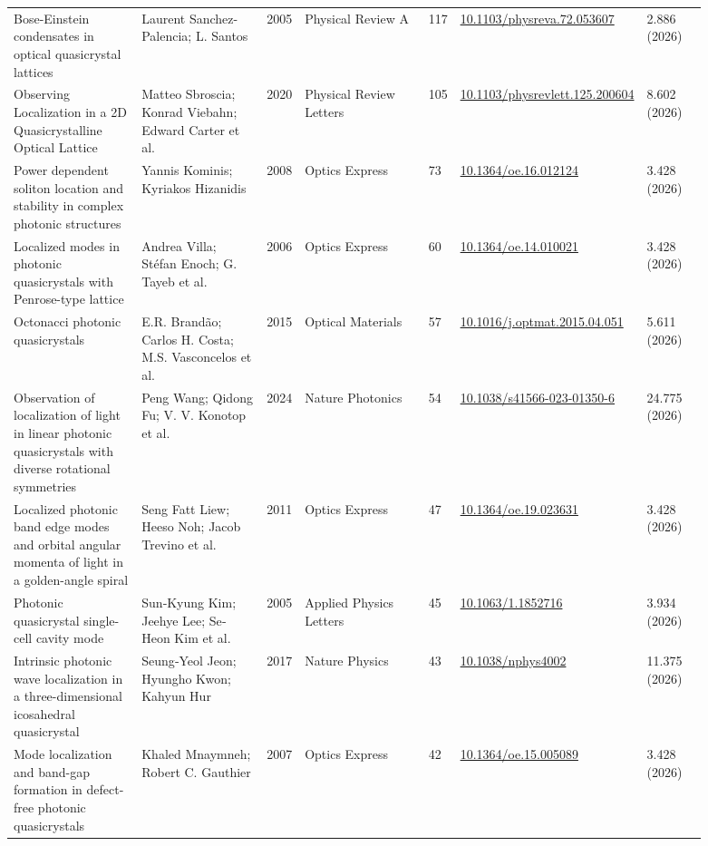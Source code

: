 \documentclass[10pt,a4paper]{article}
\begin{document}
{\begin{longtable}{p{0.192\linewidth}p{0.192\linewidth}p{0.043\linewidth}p{0.192\linewidth}p{0.043\linewidth}p{0.132\linewidth}p{0.096\linewidth}}
Bose-Einstein condensates in optical quasicrystal lattices & Laurent Sanchez-Palencia; L. Santos & 2005 & Physical Review A & 117 & \href{https://doi.org/10.1103/physreva.72.053607}{10.1103/physreva.72.053607} & 2.886 (2026) \\
Observing Localization in a 2D Quasicrystalline Optical Lattice & Matteo Sbroscia; Konrad Viebahn; Edward Carter et al. & 2020 & Physical Review Letters & 105 & \href{https://doi.org/10.1103/physrevlett.125.200604}{10.1103/physrevlett.125.200604} & 8.602 (2026) \\
Power dependent soliton location and stability in complex photonic structures & Yannis Kominis; Kyriakos Hizanidis & 2008 & Optics Express & 73 & \href{https://doi.org/10.1364/oe.16.012124}{10.1364/oe.16.012124} & 3.428 (2026) \\
Localized modes in photonic quasicrystals with Penrose-type lattice & Andrea Villa; Stéfan Enoch; G. Tayeb et al. & 2006 & Optics Express & 60 & \href{https://doi.org/10.1364/oe.14.010021}{10.1364/oe.14.010021} & 3.428 (2026) \\
Octonacci photonic quasicrystals & E.R. Brandão; Carlos H. Costa; M.S. Vasconcelos et al. & 2015 & Optical Materials & 57 & \href{https://doi.org/10.1016/j.optmat.2015.04.051}{10.1016/j.optmat.2015.04.051} & 5.611 (2026) \\
Observation of localization of light in linear photonic quasicrystals with diverse rotational symmetries & Peng Wang; Qidong Fu; V. V. Konotop et al. & 2024 & Nature Photonics & 54 & \href{https://doi.org/10.1038/s41566-023-01350-6}{10.1038/s41566-023-01350-6} & 24.775 (2026) \\
Localized photonic band edge modes and orbital angular momenta of light in a golden-angle spiral & Seng Fatt Liew; Heeso Noh; Jacob Trevino et al. & 2011 & Optics Express & 47 & \href{https://doi.org/10.1364/oe.19.023631}{10.1364/oe.19.023631} & 3.428 (2026) \\
Photonic quasicrystal single-cell cavity mode & Sun‐Kyung Kim; Jeehye Lee; Se‐Heon Kim et al. & 2005 & Applied Physics Letters & 45 & \href{https://doi.org/10.1063/1.1852716}{10.1063/1.1852716} & 3.934 (2026) \\
Intrinsic photonic wave localization in a three-dimensional icosahedral quasicrystal & Seung‐Yeol Jeon; Hyungho Kwon; Kahyun Hur & 2017 & Nature Physics & 43 & \href{https://doi.org/10.1038/nphys4002}{10.1038/nphys4002} & 11.375 (2026) \\
Mode localization and band-gap formation in defect-free photonic quasicrystals & Khaled Mnaymneh; Robert C. Gauthier & 2007 & Optics Express & 42 & \href{https://doi.org/10.1364/oe.15.005089}{10.1364/oe.15.005089} & 3.428 (2026) \\

\end{longtable}}
\end{document}
